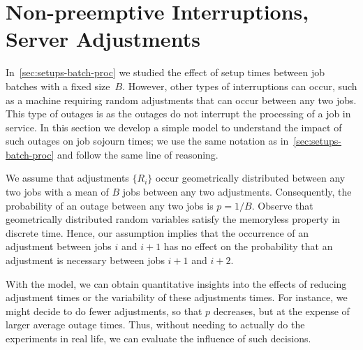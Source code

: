 \section{Non-preemptive Interruptions, Server Adjustments}
\label{sec:non-preempt-interr}


In~\cref{sec:setups-batch-proc} we studied the effect of setup times between job batches with a fixed size~$B$.
However, other types of interruptions can occur, such as a machine requiring random adjustments that can occur between any two jobs.
This type of outages is  as the outages do not interrupt the processing of a job in service.
In this section we develop a simple model to understand the impact of such outages on job sojourn times; we use the same notation as in~\cref{sec:setups-batch-proc} and follow the same line of reasoning.




We assume that adjustments $\{R_i\}$ occur geometrically distributed between any two jobs with a mean of $B$ jobs between any two adjustments.
Consequently, the probability of an outage between any two jobs is $p=1/B$.
Observe that geometrically distributed random variables satisfy the memoryless property in discrete time.
Hence, our assumption implies that the occurrence of an adjustment between jobs $i$ and $i+1$ has no effect on the probability that an adjustment is necessary between jobs $i+1$ and $i+2$.

With the model, we can obtain quantitative insights into the effects of reducing adjustment times or the variability of these adjustments times.
For instance, we might decide to do fewer adjustments, so that $p$ decreases, but at the expense of larger average outage times.
Thus, without needing to actually do the experiments in real life, we can evaluate the influence of such decisions.

